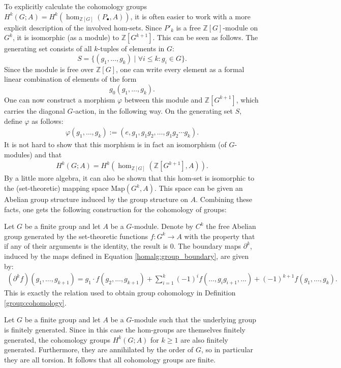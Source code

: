 	To explicitly calculate the cohomology groups $H^k(G;A) = H^k(\hom_{\mathbb{Z}[G]}(P_\bullet,A))$, it is often easier to work with a more explicit description of the involved hom-sets. Since $P'_k$ is a free $\mathbb{Z}[G]$-module on $G^k$, it is isomorphic (as a module) to $\mathbb{Z}[G^{k+1}]$. This can be seen as follows. The generating set consists of all $k$-tuples of elements in $G$: \[S=\{(g_1,\ldots,g_k)\mid\forall i\leq k:g_i\in G\}.\] Since the module is free over $\mathbb{Z}[G]$, one can write every element as a formal linear combination of elements of the form \[g_0(g_1,\ldots,g_k).\] One can now construct a morphism $\varphi$ between this module and $\mathbb{Z}[G^{k+1}]$, which carries the diagonal $G$-action, in the following way. On the generating set $S$, define $\varphi$ as follows:
	\begin{gather}
		\varphi(g_1,\ldots,g_k) := (e,g_1,g_1g_2,\ldots,g_1g_2\cdots g_k).
	\end{gather}
	It is not hard to show that this morphism is in fact an isomorphism (of $G$-modules) and that
	\begin{gather}
		H^k(G;A) = H^k(\hom_{\mathbb{Z}[G]}(\mathbb{Z}[G^{k+1}],A)).
	\end{gather}
	By a little more algebra, it can also be shown that this hom-set is isomorphic to the (set-theoretic) mapping space $\mathrm{Map}(G^k,A)$. This space can be given an Abelian group structure induced by the group structure on $A$. Combining these facts, one gets the following construction for the cohomology of groups:
	\begin{construct}
		Let $G$ be a finite group and let $A$ be a $G$-module. Denote by $C^k$ the free Abelian group generated by the set-theoretic functions $f:G^k\rightarrow A$ with the property that if any of their arguments is the identity, the result is 0. The boundary maps $\partial^k$, induced by the maps defined in Equation \eqref{homalg:group_boundary}, are given by:
		\begin{gather}
			(\partial^k f)(g_1,\ldots,g_{k+1}) = g_1\cdot f(g_2,\ldots,g_{k+1}) + \sum_{i=1}^k(-1)^if(\ldots,g_ig_{i+1},\ldots) + (-1)^{k+1}f(g_1,\ldots,g_k).
		\end{gather}
		This is exactly the relation used to obtain group cohomology in Definition \ref{group:cohomology}.
	\end{construct}

	\begin{property}[Finiteness]
		Let $G$ be a finite group and let $A$ be a $G$-module such that the underlying group is finitely generated. Since in this case the hom-groups are themselves finitely generated, the cohomology groups $H^k(G;A)$ for $k\geq1$ are also finitely generated. Furthermore, they are annihilated by the order of $G$, so in particular they are all torsion. It follows that all cohomology groups are finite.
	\end{property}

